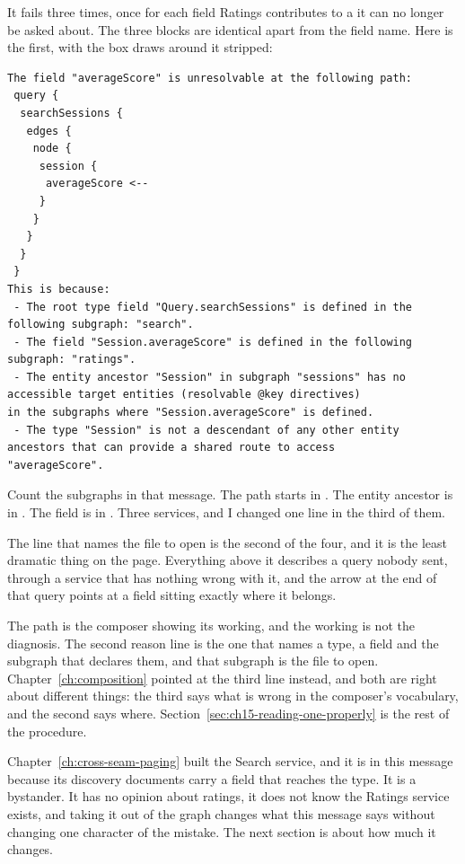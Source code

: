 %
It fails three times, once for each field Ratings contributes to a
 it can no longer be asked about. The three blocks are identical
apart from the field name. Here is the first, with the box  draws
around it stripped:

\begin{verbatim}
The field "averageScore" is unresolvable at the following path:
 query {
  searchSessions {
   edges {
    node {
     session {
      averageScore <--
     }
    }
   }
  }
 }
This is because:
 - The root type field "Query.searchSessions" is defined in the following subgraph: "search".
 - The field "Session.averageScore" is defined in the following subgraph: "ratings".
 - The entity ancestor "Session" in subgraph "sessions" has no accessible target entities (resolvable @key directives)
in the subgraphs where "Session.averageScore" is defined.
 - The type "Session" is not a descendant of any other entity ancestors that can provide a shared route to access
"averageScore".
\end{verbatim}

%
Count the subgraphs in that message. The path starts in . The
entity ancestor is in . The field is in . Three
services, and I changed one line in the third of them.

%
The line that names the file to open is the second of the four, and it is the
least dramatic thing on the page. Everything above it describes a query nobody
sent, through a service that has nothing wrong with it, and the arrow at the
end of that query points at a field sitting exactly where it belongs.

%
The path is the composer showing its working, and the working is not the
diagnosis. The second reason line is the one that names a type, a field and the
subgraph that declares them, and that subgraph is the file to open.
Chapter~\ref{ch:composition} pointed at the third line instead, and both are
right about different things: the third says what is wrong in the composer's
vocabulary, and the second says where.
Section~\ref{sec:ch15-reading-one-properly} is the rest of the procedure.

%
Chapter~\ref{ch:cross-seam-paging} built the Search service, and it is in this
message because its discovery documents carry a  field that
reaches the type. It is a bystander. It has no opinion about ratings, it does
not know the Ratings service exists, and taking it out of the graph changes
what this message says without changing one character of the mistake. The next
section is about how much it changes.
%
